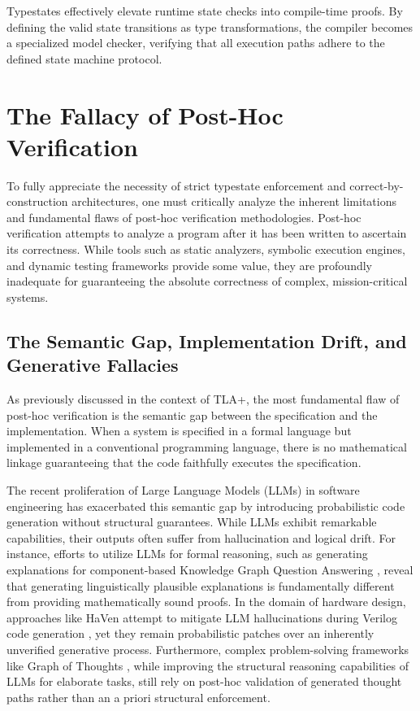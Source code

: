 Typestates effectively elevate runtime state checks into compile-time proofs. By defining the valid state transitions as type transformations, the compiler becomes a specialized model checker, verifying that all execution paths adhere to the defined state machine protocol.

\section{The Fallacy of Post-Hoc Verification}

To fully appreciate the necessity of strict typestate enforcement and correct-by-construction architectures, one must critically analyze the inherent limitations and fundamental flaws of post-hoc verification methodologies. Post-hoc verification attempts to analyze a program after it has been written to ascertain its correctness. While tools such as static analyzers, symbolic execution engines, and dynamic testing frameworks provide some value, they are profoundly inadequate for guaranteeing the absolute correctness of complex, mission-critical systems.

\subsection{The Semantic Gap, Implementation Drift, and Generative Fallacies}

As previously discussed in the context of TLA+, the most fundamental flaw of post-hoc verification is the semantic gap between the specification and the implementation. When a system is specified in a formal language but implemented in a conventional programming language, there is no mathematical linkage guaranteeing that the code faithfully executes the specification.

The recent proliferation of Large Language Models (LLMs) in software engineering has exacerbated this semantic gap by introducing probabilistic code generation without structural guarantees. While LLMs exhibit remarkable capabilities, their outputs often suffer from hallucination and logical drift. For instance, efforts to utilize LLMs for formal reasoning, such as generating explanations for component-based Knowledge Graph Question Answering \cite{ref_TowardsLLMgener23}, reveal that generating linguistically plausible explanations is fundamentally different from providing mathematically sound proofs. In the domain of hardware design, approaches like HaVen attempt to mitigate LLM hallucinations during Verilog code generation \cite{ref_HaVenHallucinat16}, yet they remain probabilistic patches over an inherently unverified generative process. Furthermore, complex problem-solving frameworks like Graph of Thoughts \cite{ref_GraphofThoughts22}, while improving the structural reasoning capabilities of LLMs for elaborate tasks, still rely on post-hoc validation of generated thought paths rather than an a priori structural enforcement.

